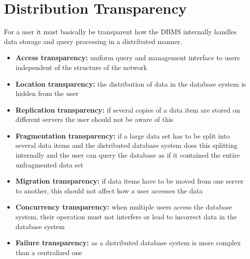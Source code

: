 \section{Distribution Transparency}
For a user it must basically be transparent how the DBMS internally handles data storage and query processing in a distributed manner.
\begin{itemize}
    \item \textbf{Access transparency:} uniform query and management interface to users independent of the structure of the network
    \item \textbf{Location transparency:} the distribution of data in the database system is hidden from the user
    \item \textbf{Replication transparency:} if several copies of a data item are stored on different servers the user should not be aware of this
    \item \textbf{Fragmentation transparency:} if a large data set has to be split into several data items and the distributed database system does this splitting internally and the user can query the database as if it contained the entire unfragmented data set
    \item \textbf{Migration transparency:} if data items have to be moved from one server to another, this should not affect how a user accesses the data
    \item \textbf{Concurrency transparency:} when multiple users access the database system, their operation must not interfere or lead to incorrect data in the database system
    \item \textbf{Failure transparency:} as a distributed database system is more complex than a centralized one
\end{itemize}

